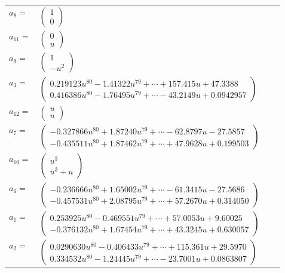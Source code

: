 \documentclass[1p]{elsarticle_modified}
\theoremstyle{definition}
\begin{document}
\begin{tabular}{m{7pt} m{180pt} m{7pt} m{180pt} }
\flushright $a_{8}=$&$\begin{pmatrix}1\\0\end{pmatrix}$ \\
\flushright $a_{11}=$&$\begin{pmatrix}0\\u\end{pmatrix}$ \\
\flushright $a_{9}=$&$\begin{pmatrix}1\\- u^2\end{pmatrix}$ \\
\flushright $a_{3}=$&$\begin{pmatrix}0.219123 u^{80}-1.41322 u^{79}+\cdots+157.415 u+47.3388\\0.416386 u^{80}-1.76495 u^{79}+\cdots-43.2149 u+0.0942957\end{pmatrix}$ \\
\flushright $a_{12}=$&$\begin{pmatrix}u\\u\end{pmatrix}$ \\
\flushright $a_{7}=$&$\begin{pmatrix}-0.327866 u^{80}+1.87240 u^{79}+\cdots-62.8797 u-27.5857\\-0.435511 u^{80}+1.87462 u^{79}+\cdots+47.9628 u+0.199503\end{pmatrix}$ \\
\flushright $a_{10}=$&$\begin{pmatrix}u^3\\u^3+u\end{pmatrix}$ \\
\flushright $a_{6}=$&$\begin{pmatrix}-0.236666 u^{80}+1.65002 u^{79}+\cdots-61.3415 u-27.5686\\-0.457531 u^{80}+2.08795 u^{79}+\cdots+57.2670 u+0.314050\end{pmatrix}$ \\
\flushright $a_{1}=$&$\begin{pmatrix}0.253925 u^{80}-0.469551 u^{79}+\cdots+57.0053 u+9.60025\\-0.376132 u^{80}+1.67454 u^{79}+\cdots+43.3245 u+0.630057\end{pmatrix}$ \\
\flushright $a_{2}=$&$\begin{pmatrix}0.0290630 u^{80}-0.406433 u^{79}+\cdots+115.361 u+29.5970\\0.334532 u^{80}-1.24445 u^{79}+\cdots-23.7001 u+0.0863807\end{pmatrix}$ \\

\end{tabular}
\end{document}
